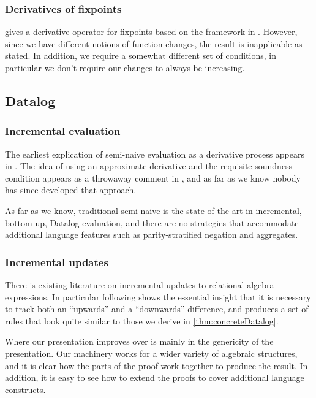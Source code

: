 \subsubsection{Derivatives of fixpoints}

\textcite{arntz2017fixpoints} gives a derivative operator for fixpoints based on
the framework in \textcite{cai2014changes}. However, since we have different
notions of function changes, the result is inapplicable as
stated. In addition, we require a somewhat different set of conditions, in particular we
don't require our changes to always be increasing.

\subsection{Datalog}

\subsubsection{Incremental evaluation}

The earliest explication of semi-naive evaluation as a derivative process
appears in \textcite{bancilhon1986naive}. The idea of using an approximate derivative
and the requisite soundness condition appears as a throwaway comment in
\textcite[][section 3.2.2]{bancilhon1986amateur}, and as far as we know nobody has since
developed that approach.

As far as we know, traditional semi-naive is the state of
the art in incremental, bottom-up, Datalog evaluation, and there are no strategies that
accommodate additional language features such as parity-stratified negation and aggregates.

\subsubsection{Incremental updates}

There is existing literature on incremental updates to relational algebra
expressions. In particular \textcite{griffin1997improved} following
\textcite{qian1991incremental} shows the essential insight that it is necessary to
track both an ``upwards'' and a ``downwards'' difference, and produces a set of
rules that look quite similar to those we derive in \cref{thm:concreteDatalog}.

Where our presentation improves over \citeauthor{griffin1997improved} is mainly in
the genericity of the presentation. Our machinery works for a wider variety of
algebraic structures, and it is clear how the parts of the proof work together
to produce the result. In addition, it is easy to see how to extend the proofs
to cover additional language constructs.

